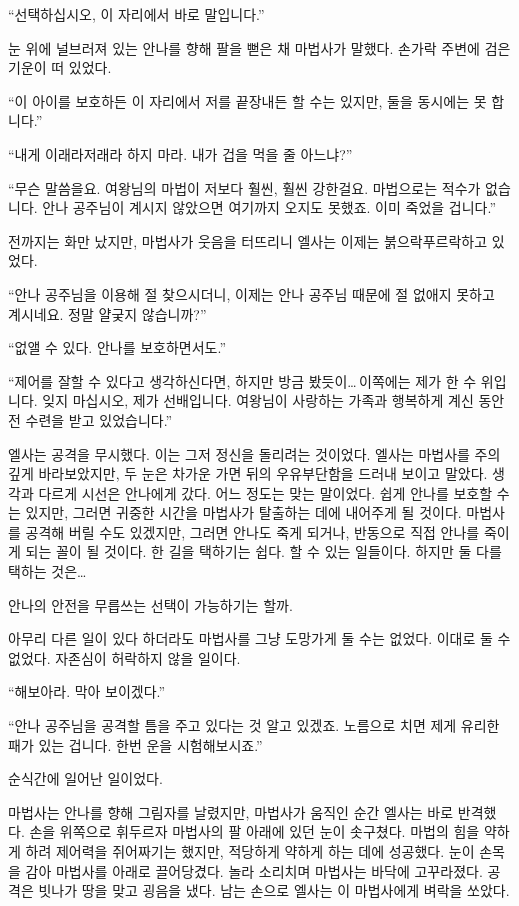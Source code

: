 ``선택하십시오, 이 자리에서 바로 말입니다.''

눈 위에 널브러져 있는 안나를 향해 팔을 뻗은 채 마법사가 말했다. 손가락 주변에 검은 기운이 떠 있었다.

``이 아이를 보호하든 이 자리에서 저를 끝장내든 할 수는 있지만, 둘을 동시에는 못 합니다.''

``내게 이래라저래라 하지 마라. 내가 겁을 먹을 줄 아느냐?''

``무슨 말씀을요. 여왕님의 마법이 저보다 훨씬, 훨씬 강한걸요. 마법으로는 적수가 없습니다. 안나 공주님이 계시지 않았으면 여기까지 오지도 못했죠. 이미 죽었을 겁니다.''

전까지는 화만 났지만, 마법사가 웃음을 터뜨리니 엘사는 이제는 붉으락푸르락하고 있었다.

``안나 공주님을 이용해 절 찾으시더니, 이제는 안나 공주님 때문에 절 없애지 못하고 계시네요. 정말 얄궂지 않습니까?''

``없앨 수 있다. 안나를 보호하면서도.''

``제어를 잘할 수 있다고 생각하신다면, 하지만 방금 봤듯이\ldots\,이쪽에는 제가 한 수 위입니다. 잊지 마십시오, 제가 선배입니다. 여왕님이 사랑하는 가족과 행복하게 계신 동안 전 수련을 받고 있었습니다.''

엘사는 공격을 무시했다. 이는 그저 정신을 돌리려는 것이었다. 엘사는 마법사를 주의 깊게 바라보았지만, 두 눈은 차가운 가면 뒤의 우유부단함을 드러내 보이고 말았다. 생각과 다르게 시선은 안나에게 갔다. 어느 정도는 맞는 말이었다. 쉽게 안나를 보호할 수는 있지만, 그러면 귀중한 시간을 마법사가 탈출하는 데에 내어주게 될 것이다. 마법사를 공격해 버릴 수도 있겠지만, 그러면 안나도 죽게 되거나, 반동으로 직접 안나를 죽이게 되는 꼴이 될 것이다. 한 길을 택하기는 쉽다. 할 수 있는 일들이다. 하지만 둘 다를 택하는 것은\ldots

안나의 안전을 무릅쓰는 선택이 가능하기는 할까.

아무리 다른 일이 있다 하더라도 마법사를 그냥 도망가게 둘 수는 없었다. 이대로 둘 수 없었다. 자존심이 허락하지 않을 일이다.

``해보아라. 막아 보이겠다.''

``안나 공주님을 공격할 틈을 주고 있다는 것 알고 있겠죠. 노름으로 치면 제게 유리한 패가 있는 겁니다. 한번 운을 시험해보시죠.''

순식간에 일어난 일이었다.

마법사는 안나를 향해 그림자를 날렸지만, 마법사가 움직인 순간 엘사는 바로 반격했다. 손을 위쪽으로 휘두르자 마법사의 팔 아래에 있던 눈이 솟구쳤다. 마법의 힘을 약하게 하려 제어력을 쥐어짜기는 했지만, 적당하게 약하게 하는 데에 성공했다. 눈이 손목을 감아 마법사를 아래로 끌어당겼다. 놀라 소리치며 마법사는 바닥에 고꾸라졌다. 공격은 빗나가 땅을 맞고 굉음을 냈다. 남는 손으로 엘사는 이 마법사에게 벼락을 쏘았다.

